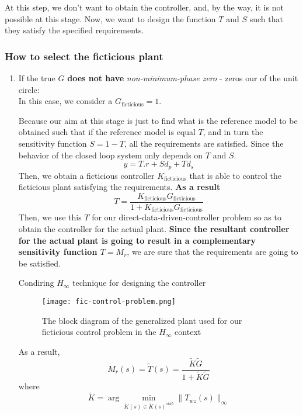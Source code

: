  At this step, we don't want to obtain the controller, and, by the way, it is not possible at this stage. Now, we want to design the function $T$ and $S$ such that they satisfy the specified requirements.\\

\subsubsection{How to select the ficticious plant}
\begin{enumerate}
    \item If the true $G$\textbf{ does not have} \textit{non-minimum-phase zero} - zeros our of the unit circle:\\
    In this case, we consider a $G_{\text{ficticious}} = 1$.\\
    \begin{QandAbox}
    Because our aim at this stage is just to find what is the reference model to be obtained such that if the reference model is equal $T$, and in turn the sensitivity function $S = 1 - T$, all the requirements are satisfied. Since the behavior of the closed loop system only depends on $T$ and $S$.
     \[
 y = T.r + Sd_p + Td_s
 \]
  Then, we obtain a ficticious controller $K_{\text{ficticious}}$ that is able to control the ficticious plant satisfying the requirements. \textbf{As a result}
  \[
  T = \frac{K_{\text{ficticious}}G_{\text{ficticious}}}{1 + K_{\text{ficticious}}G_{\text{ficticious}}}
  \]
  Then, we use this $T$ for our direct-data-driven-controller problem so as to obtain the controller for the actual plant. \textbf{Since the resultant controller for the actual plant is going to result in a complementary sensitivity function $T = M_r$}, we are sure that the requirements are going to be satisfied.
    \end{QandAbox}
    \begin{example}
    Condiring $H_\infty $ technique for designing the controller
     \begin{figure}[H]
    \centering \texttt{[image: fic-control-problem.png]}
    \caption{The block diagram of the generalized plant used for our ficticious control problem in the $H_\infty$ context}
 \end{figure}
 As a result,
 \[
 M_r(s) = \tilde{T}(s) = \frac{\tilde{K}\tilde{G}}{1 + \tilde{K}\tilde{G}}
 \]
 where
 \[
 \tilde{K} = \arg \min\limits_{\tilde{K}(s) \in \tilde{K}(s)^{stab}} \|T_{wz}(s)\|_\infty
\]
\end{example}
\end{enumerate}
